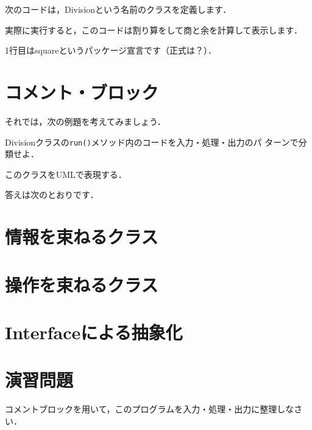 \documentclass[a4j,papersize]{jsbook}
\begin{document}
次のコードは，Divisionという名前のクラスを定義します．

実際に実行すると，このコードは割り算をして商と余を計算して表示します．



1行目はsquareというパッケージ宣言です（正式は？）．

\section{コメント・ブロック}
それでは，次の例題を考えてみましょう．

\begin{例題}
 Divisionクラスの\texttt{run()}メソッド内のコードを入力・処理・出力のパ
 ターンで分類せよ．
\end{例題}

このクラスをUMLで表現する．

答えは次のとおりです．



\section{情報を束ねるクラス}


\section{操作を束ねるクラス}


\section{Interfaceによる抽象化}


\newpage
\section{演習問題}

\begin{演習}
 コメントブロックを用いて，このプログラムを入力・処理・出力に整理しなさ
 い．
 
\end{演習}
\end{document}
